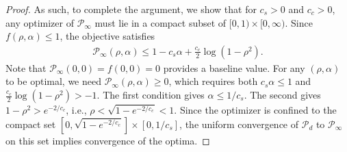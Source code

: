 \documentclass[12pt]{article}
\theoremstyle{definition}
\theoremstyle{remark}
\begin{document}
\begin{proof}
{As such, to complete the argument, we show that for $c_s > 0$ and $c_c > 0$, any optimizer of $\mathcal{P}_\infty$ must lie in a compact subset of $[0,1) \times [0,\infty)$. Since $f(\rho, \alpha) \leq 1$, the objective satisfies
\begin{align*}
    \mathcal{P}_\infty(\rho, \alpha) \leq 1 - c_s \alpha + \frac{c_c}{2} \log(1-\rho^2).
\end{align*}
Note that $\mathcal{P}_\infty(0, 0) = f(0,0) = 0$ provides a baseline value. For any $(\rho, \alpha)$ to be optimal, we need $\mathcal{P}_\infty(\rho, \alpha) \geq 0$, which requires both $c_s \alpha \leq 1$ and $\frac{c_c}{2} \log(1-\rho^2) > -1$. The first condition gives $\alpha \leq 1/c_s$. The second gives $1-\rho^2 > e^{-2/c_c}$, i.e., $\rho < \sqrt{1 - e^{-2/c_c}} < 1$. Since the optimizer is confined to the compact set $[0, \sqrt{1 - e^{-2/c_c}}] \times [0, 1/c_s]$, the uniform convergence of $\mathcal{P}_d$ to $\mathcal{P}_\infty$ on this set implies convergence of the optima.}


\end{proof}
\end{document}
